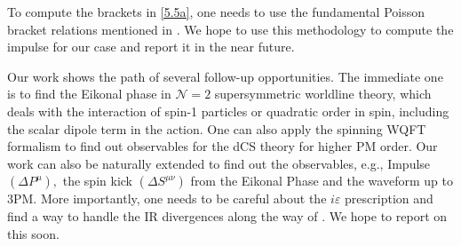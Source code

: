  To compute the brackets in \eqref{5.5a}, one needs to use the fundamental Poisson bracket relations mentioned in \cite{Kim:2024grz}. We hope to use this methodology to compute the impulse for our case and report it in the near future.


Our work shows the path of several follow-up opportunities. The immediate one is to find the Eikonal phase in $\mathcal{N}=2$ supersymmetric worldline theory, which deals with the interaction of spin-1 particles or quadratic order in spin, including the scalar dipole term in the action. One can also apply the spinning WQFT formalism to find out observables for the dCS theory for higher PM order. Our work can also be naturally extended to find out the observables, e.g., Impulse $(\Delta P^{\mu}),$ the spin kick $(\Delta S^{\mu\nu})$ from the Eikonal Phase and the waveform up to 3PM. More importantly, one needs to be careful about the $i\varepsilon$ prescription and find a way to handle the IR divergences along the way of \cite{Kim:2024svw}.  We hope to report on this soon.


\appendix 
